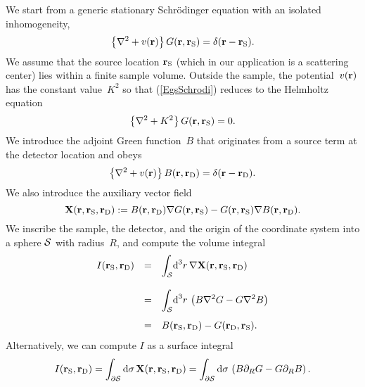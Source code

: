 We start from a generic stationary Schrödinger equation
with an isolated inhomogeneity,
\begin{equation}\label{EgsSchrodi}
  \left\{\mathbf{\nabla}^2+v(\mathbf{r})\right\}G(\mathbf{r},\mathbf{r}_\text{S}) = \delta(\mathbf{r}-\mathbf{r}_\text{S}).
\end{equation}
We assume that the source location $\mathbf{r}_\text{S}$
%
(which in our application is a scattering center)
lies within a finite sample volume.
Outside the sample, the potential~$v(\mathbf{r})$ has the constant value~$K^2$
so that (\ref{EgsSchrodi})
reduces to the Helmholtz equation%
\begin{equation}\label{EgsSchrodiHelmh}
  \left\{\mathbf{\nabla}^2+K^2\right\}G(\mathbf{r},\mathbf{r}_\text{S}) = 0.
\end{equation}
We introduce the adjoint Green function~$B$
%
that originates from a source term at the detector location
and obeys
\begin{equation}\label{EgsSchrodiAdj}
  \left\{\mathbf{\nabla}^2+v(\mathbf{r})\right\}B(\mathbf{r},\mathbf{r}_\text{D}) = \delta(\mathbf{r}-\mathbf{r}_\text{D}).
\end{equation}
We also introduce the auxiliary vector field
\begin{equation}
  \mathbf{X}(\mathbf{r},\mathbf{r}_\text{S},\mathbf{r}_\text{D}):=B(\mathbf{r},\mathbf{r}_\text{D})\mathbf{\nabla} G(\mathbf{r},\mathbf{r}_\text{S}) - G(\mathbf{r},\mathbf{r}_\text{S})\mathbf{\nabla} B(\mathbf{r},\mathbf{r}_\text{D}).
\end{equation}
%
We inscribe the sample, the detector, and the origin of the coordinate system
into a sphere $\mathcal{S}$ with radius~$R$,
%
%
and compute the volume integral
\begin{equation}\label{Eprerecipro}
  \begin{array}{lcl}
    I(\mathbf{r}_\text{S},\mathbf{r}_\text{D})
  &=& \displaystyle\int_{\mathcal{S}}\!\text{d}^3r\,\mathbf{\nabla} \mathbf{X}(\mathbf{r},\mathbf{r}_\text{S},\mathbf{r}_\text{D})
  \\[1.8em]
  &=& \displaystyle\int_{\mathcal{S}}\!\text{d}^3r\,\left(
    B\mathbf{\nabla}^2 G- G\mathbf{\nabla}^2 B \right)
  \\[1.4em]
  &=&  B(\mathbf{r}_\text{S},\mathbf{r}_\text{D}) - G(\mathbf{r}_\text{D},\mathbf{r}_\text{S}).
  \end{array}
\end{equation}
Alternatively, we can compute $I$ as a surface integral
\begin{equation}
  I(\mathbf{r}_\text{S},\mathbf{r}_\text{D})
  =\displaystyle\int_{\partial\mathcal{S}}\text{d}\mathbf{\sigma}\,\mathbf{X}(\mathbf{r},\mathbf{r}_\text{S},\mathbf{r}_\text{D})
  =\displaystyle\int_{\partial\mathcal{S}}\text{d}{\sigma}\,
       \left(B\partial_R G - G\partial_R B\right).
\end{equation}
